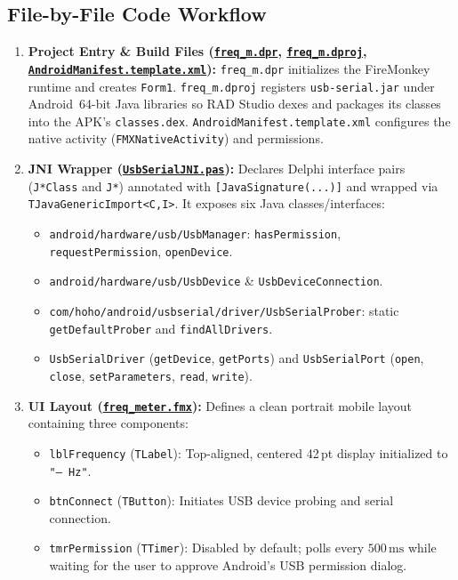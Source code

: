 \documentclass[11pt,a4paper]{article}
\newcommand{\githubrepo}{https://github.com/m7mdelsayegh/frequency_meter}
\newcommand{\ghblob}[2]{\href{\githubrepo/blob/main/#1}{\texttt{#2}}}
\begin{document}
\subsection{File-by-File Code Workflow}

\begin{enumerate}[leftmargin=1.5em]
    \item \textbf{Project Entry \& Build Files (\ghblob{3_Delphi_Android_App/freq_m.dpr}{freq\_m.dpr}, \ghblob{3_Delphi_Android_App/freq_m.dproj}{freq\_m.dproj}, \ghblob{3_Delphi_Android_App/AndroidManifest.template.xml}{AndroidManifest.template.xml}):}
    \texttt{freq\_m.dpr} initializes the FireMonkey runtime and creates \texttt{Form1}. \texttt{freq\_m.dproj} registers \texttt{usb-serial.jar} under Android~64-bit Java libraries so RAD Studio dexes and packages its classes into the APK's \texttt{classes.dex}. \texttt{AndroidManifest.template.xml} configures the native activity (\texttt{FMXNativeActivity}) and permissions.

    \item \textbf{JNI Wrapper (\ghblob{3_Delphi_Android_App/UsbSerialJNI.pas}{UsbSerialJNI.pas}):}
    Declares Delphi interface pairs (\texttt{J*Class} and \texttt{J*}) annotated with \texttt{[JavaSignature(...)]} and wrapped via \texttt{TJavaGenericImport<C,I>}. It exposes six Java classes/interfaces:
    \begin{itemize}
        \item \texttt{android/hardware/usb/UsbManager}: \texttt{hasPermission}, \texttt{requestPermission}, \texttt{openDevice}.
        \item \texttt{android/hardware/usb/UsbDevice} \& \texttt{UsbDeviceConnection}.
        \item \texttt{com/hoho/android/usbserial/driver/UsbSerialProber}: static \texttt{getDefaultProber} and \texttt{findAllDrivers}.
        \item \texttt{UsbSerialDriver} (\texttt{getDevice}, \texttt{getPorts}) and \texttt{UsbSerialPort} (\texttt{open}, \texttt{close}, \texttt{setParameters}, \texttt{read}, \texttt{write}).
    \end{itemize}

    \item \textbf{UI Layout (\ghblob{3_Delphi_Android_App/freq_meter.fmx}{freq\_meter.fmx}):}
    Defines a clean portrait mobile layout containing three components:
    \begin{itemize}
        \item \texttt{lblFrequency} (\texttt{TLabel}): Top-aligned, centered 42\,pt display initialized to \texttt{"--- Hz"}.
        \item \texttt{btnConnect} (\texttt{TButton}): Initiates USB device probing and serial connection.
        \item \texttt{tmrPermission} (\texttt{TTimer}): Disabled by default; polls every $500\,\text{ms}$ while waiting for the user to approve Android's USB permission dialog.
    \end{itemize}


\end{enumerate}
\end{document}
